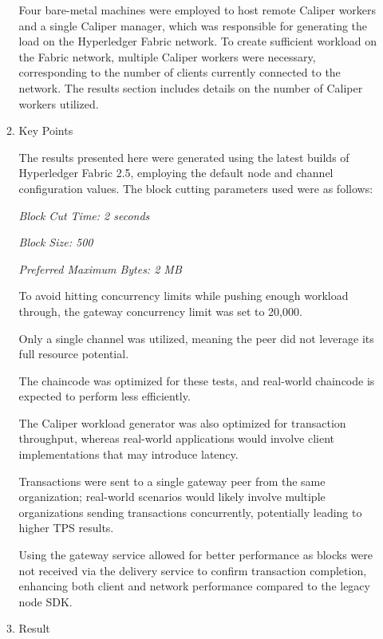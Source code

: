 \documentclass[conference]{IEEEtran}
\begin{document}
\begin{enumerate}[itemsep=2ex, parsep=1ex]
\begin{enumerate}[itemsep=2ex, parsep=1ex]
					Four bare-metal machines were employed to host remote Caliper workers and
					a single Caliper manager, which was responsible for generating the
					load on the Hyperledger Fabric network. To create sufficient workload on
					the Fabric network, multiple Caliper workers were necessary, corresponding
					to the number of clients currently connected to the network. The
					results section includes details on the number of Caliper workers
					utilized.

				\item Key Points

					The results presented here were generated using the latest builds of
					Hyperledger Fabric 2.5, employing the default node and channel configuration
					values. The block cutting parameters used were as follows:

					\textit{Block Cut Time: 2 seconds}

					\textit{Block Size: 500}

					\textit{Preferred Maximum Bytes: 2 MB}

					To avoid hitting concurrency limits while pushing enough workload
					through, the gateway concurrency limit was set to 20,000.

					Only a single channel was utilized, meaning the peer did not leverage its
					full resource potential.

					The chaincode was optimized for these tests, and real-world chaincode
					is expected to perform less efficiently.

					The Caliper workload generator was also optimized for transaction
					throughput, whereas real-world applications would involve client implementations
					that may introduce latency.

					Transactions were sent to a single gateway peer from the same organization;
					real-world scenarios would likely involve multiple organizations
					sending transactions concurrently, potentially leading to higher TPS results.

					Using the gateway service allowed for better performance as blocks were
					not received via the delivery service to confirm transaction completion,
					enhancing both client and network performance compared to the legacy
					node SDK.

				\item Result


\end{enumerate}
\end{enumerate}
\end{document}
